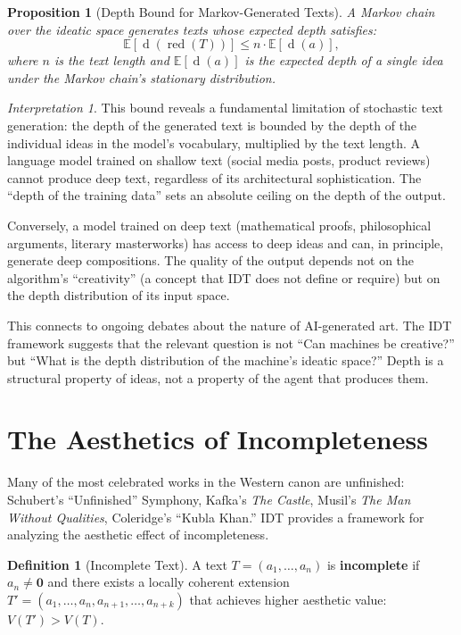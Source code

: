 \documentclass[11pt,openany]{book}
\theoremstyle{definition}
\newtheorem{definition}[axiom]{Definition}
\theoremstyle{plain}
\newtheorem{proposition}[axiom]{Proposition}
\theoremstyle{remark}
\newtheorem{interpretation}[axiom]{Interpretation}
\newcommand{\void}{\mathbf{0}}              %
\newcommand{\depth}{\operatorname{d}}       %
\begin{document}
\begin{proposition}[Depth Bound for Markov-Generated Texts]
A Markov chain over the ideatic space generates texts whose expected depth satisfies:
\[
\mathbb{E}[\depth(\operatorname{red}(T))] \leq n \cdot \mathbb{E}[\depth(a)],
\]
where $n$ is the text length and $\mathbb{E}[\depth(a)]$ is the expected depth of a single idea under the Markov chain's stationary distribution.
\end{proposition}

\begin{interpretation}
This bound reveals a fundamental limitation of stochastic text generation: the depth of the generated text is bounded by the depth of the individual ideas in the model's vocabulary, multiplied by the text length. A language model trained on shallow text (social media posts, product reviews) cannot produce deep text, regardless of its architectural sophistication. The ``depth of the training data'' sets an absolute ceiling on the depth of the output.

Conversely, a model trained on deep text (mathematical proofs, philosophical arguments, literary masterworks) has access to deep ideas and can, in principle, generate deep compositions. The quality of the output depends not on the algorithm's ``creativity'' (a concept that IDT does not define or require) but on the depth distribution of its input space.

This connects to ongoing debates about the nature of AI-generated art. The IDT framework suggests that the relevant question is not ``Can machines be creative?'' but ``What is the depth distribution of the machine's ideatic space?'' Depth is a structural property of ideas, not a property of the agent that produces them.
\end{interpretation}

\section{The Aesthetics of Incompleteness}

Many of the most celebrated works in the Western canon are unfinished: Schubert's ``Unfinished'' Symphony, Kafka's \textit{The Castle}, Musil's \textit{The Man Without Qualities}, Coleridge's ``Kubla Khan.'' IDT provides a framework for analyzing the aesthetic effect of incompleteness.

\begin{definition}[Incomplete Text]
A text $T = (a_1, \ldots, a_n)$ is \textbf{incomplete} if $a_n \neq \void$ and there exists a locally coherent extension $T' = (a_1, \ldots, a_n, a_{n+1}, \ldots, a_{n+k})$ that achieves higher aesthetic value: $V(T') > V(T)$.
\end{definition}
\end{document}
